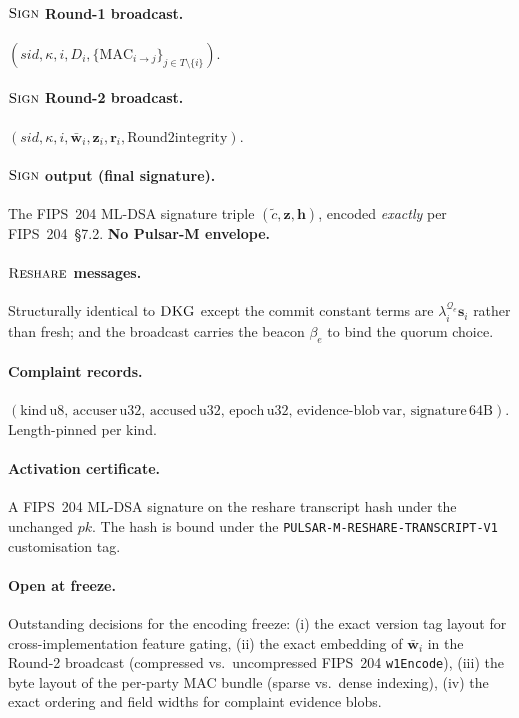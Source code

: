 \documentclass[11pt,a4paper]{article}
\theoremstyle{definition}
\theoremstyle{remark}
\newcommand{\Sign}{\textsc{Sign}}
\newcommand{\DKG}{\textsc{DKG}}
\newcommand{\Reshare}{\textsc{Reshare}}
\begin{document}
\paragraph{$\Sign$ Round-1 broadcast.}
$(\mathit{sid}, \kappa, i, D_i, \{\mathrm{MAC}_{i \to j}\}_{j \in T \setminus \{i\}})$.

\paragraph{$\Sign$ Round-2 broadcast.}
$(\mathit{sid}, \kappa, i, \bar{\mathbf{w}}_i, \mathbf{z}_i, \mathbf{r}_i, \text{Round2integrity})$.

\paragraph{$\Sign$ output (final signature).}
The FIPS~204 ML-DSA signature triple $(\tilde c, \mathbf{z}, \mathbf{h})$,
encoded \emph{exactly} per FIPS~204~\S7.2. \textbf{No Pulsar-M envelope.}

\paragraph{$\Reshare$ messages.}
Structurally identical to $\DKG$ except the commit constant terms
are $\lambda_i^{\mathcal{Q}_e} \mathbf{s}_i$ rather than fresh; and the
broadcast carries the beacon $\beta_e$ to bind the quorum choice.

\paragraph{Complaint records.}
$(\text{kind}\,\text{u8},\,\text{accuser}\,\text{u32},\,\text{accused}\,\text{u32},\,\text{epoch}\,\text{u32},\,\text{evidence-blob}\,\text{var},\,\text{signature}\,\text{64B})$.
Length-pinned per kind.

\paragraph{Activation certificate.}
A FIPS~204 ML-DSA signature on the reshare transcript hash under the
unchanged $\mathit{pk}$. The hash is bound under the
\texttt{PULSAR-M-RESHARE-TRANSCRIPT-V1} customisation tag.

\paragraph{Open at freeze.}
Outstanding decisions for the encoding freeze:
(i) the exact version tag layout for cross-implementation feature
gating,
(ii) the exact embedding of $\bar{\mathbf{w}}_i$ in the Round-2
broadcast (compressed vs.\ uncompressed FIPS~204
\texttt{w1Encode}),
(iii) the byte layout of the per-party MAC bundle (sparse vs.\
dense indexing),
(iv) the exact ordering and field widths for complaint evidence blobs.
\end{document}

